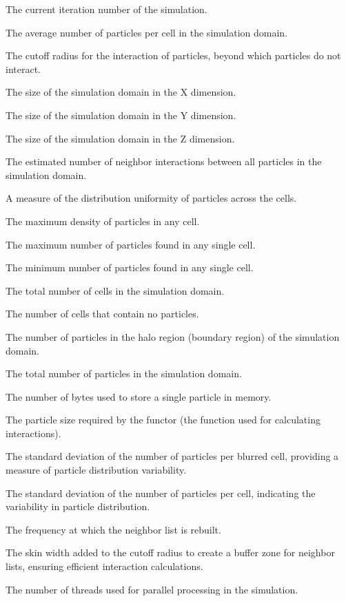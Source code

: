 \begin{description}[style=multiline, leftmargin =40mm]
  \item [Iteration] The current iteration number of the simulation.
  \item [avgParticlesPerCell] The average number of particles per cell in the simulation domain.
  \item [cutoff] The cutoff radius for the interaction of particles, beyond which particles do not interact.
  \item [domainSizeX] The size of the simulation domain in the X dimension.
  \item [domainSizeY] The size of the simulation domain in the Y dimension.
  \item [domainSizeZ] The size of the simulation domain in the Z dimension.
  \item [estimatedNumNeighborInteractions] The estimated number of neighbor interactions between all particles in the simulation domain.
  \item [homogeneity] A measure of the distribution uniformity of particles across the cells.
  \item [maxDensity] The maximum density of particles in any cell.
  \item [maxParticlesPerCell] The maximum number of particles found in any single cell.
  \item [minParticlesPerCell] The minimum number of particles found in any single cell.
  \item [numCells] The total number of cells in the simulation domain.
  \item [numEmptyCells] The number of cells that contain no particles.
  \item [numHaloParticles] The number of particles in the halo region (boundary region) of the simulation domain.
  \item [numParticles] The total number of particles in the simulation domain.
  \item [particleSize] The number of bytes used to store a single particle in memory.
  \item [particleSizeNeededByFunctor] The particle size required by the functor (the function used for calculating interactions).
  \item [particlesPerBlurredCellStdDev] The standard deviation of the number of particles per blurred cell, providing a measure of particle distribution variability.
  \item [particlesPerCellStdDev] The standard deviation of the number of particles per cell, indicating the variability in particle distribution.
  \item [rebuildFrequency] The frequency at which the neighbor list is rebuilt.
  \item [skin] The skin width added to the cutoff radius to create a buffer zone for neighbor lists, ensuring efficient interaction calculations.
  \item [threadCount] The number of threads used for parallel processing in the simulation.
\end{description}


